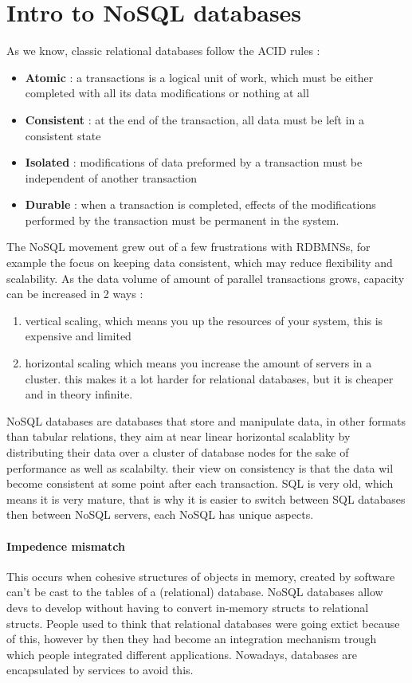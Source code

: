 \documentclass{report}
\begin{document}
	\chapter{Intro to NoSQL databases}
		As we know, classic relational databases follow the ACID rules : 
		\begin{itemize}
			\item \textbf{Atomic} : a transactions is a logical unit of work, which must be either completed with all its data modifications or nothing at all
			\item \textbf{Consistent} : at the end of the transaction, all data must be left in a consistent state
			\item \textbf{Isolated} : modifications of data preformed by a transaction must be independent of another transaction
			\item \textbf{Durable} : when a transaction is completed, effects of the modifications performed by the transaction must be permanent in the system.
		\end{itemize}
		The NoSQL movement grew out of a few frustrations with RDBMNSs, for example the focus on keeping data consistent, which may reduce flexibility and scalability. As the data volume of amount of parallel transactions grows, capacity can be increased in 2 ways : 
		\begin{enumerate}
			\item vertical scaling, which means you up the resources of your system, this is expensive and limited
			\item horizontal scaling which means you increase the amount of servers in a cluster. this makes it a lot harder for relational databases, but it is cheaper and in theory infinite.
		\end{enumerate}
		NoSQL databases are databases that store and manipulate data, in other formats than tabular relations, they aim at near linear horizontal scalablity by distributing their data over a cluster of database nodes for the sake of performance as well as scalabilty. their view on consistency is that the data wil become consistent at some point after each transaction.
		SQL is very old, which means it is very mature, that is why it is easier to switch between SQL databases then between NoSQL servers, each NoSQL has unique aspects.
		\subsubsection{Impedence mismatch}
			This occurs when cohesive structures of objects in memory, created by software can't be cast to the tables of a (relational) database.
			NoSQL databases allow devs to develop without having to convert in-memory structs to relational structs. People used to think that relational databases were going extict because of this, however by then they had become an integration mechanism trough which people integrated different applications.
			Nowadays, databases are encapsulated by services to avoid this.
\end{document}
